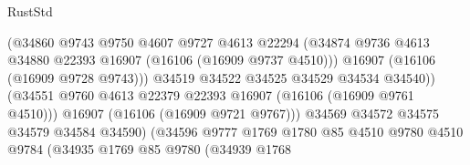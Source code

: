 \begin{lexlean}{RustStd}
\begin{coremodule}
                                            (@34860
                                              @9743
                                              @9750
                                              @4607
                                              @9727
                                              @4613
                                              @22294
                                              (@34874
                                                @9736
                                                @4613
                                                @34880
                                                @22393
                                                @16907
                                                (@16106 (@16909 @9737 @4510)))
                                              @16907
                                              (@16106 (@16909 @9728 @9743)))
                                            @34519
                                            @34522
                                            @34525
                                            @34529
                                            @34534
                                            @34540))
                                        (@34551
                                          @9760
                                          @4613
                                          @22379
                                          @22393
                                          @16907
                                          (@16106 (@16909 @9761 @4510)))
                                        @16907
                                        (@16106 (@16909 @9721 @9767)))
                                      @34569
                                      @34572
                                      @34575
                                      @34579
                                      @34584
                                      @34590)
                                    (@34596
                                      @9777
                                      @1769
                                      @1780
                                      @85
                                      @4510
                                      @9780
                                      @4510
                                      @9784
                                      (@34935
                                        @1769
                                        @85
                                        @9780
                                        (@34939
                                          @1768

\end{coremodule}
\end{lexlean}
